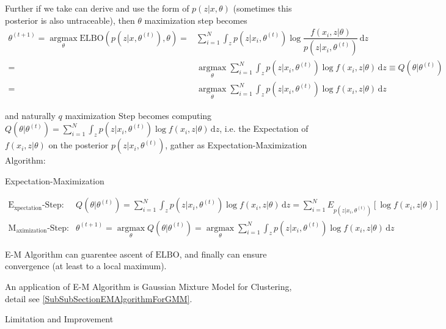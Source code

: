     Further if we take can derive and use the form of $ p(z|x,\theta ) $ (sometimes this posterior is also untraceable), then $ \theta  $ maximization step becomes 
\begin{align}
    \theta ^{(t+1)}=\mathop{\arg\max}\limits_{\theta } \mathrm{ELBO} \left(p(z|x,\theta^{(t)} ),\theta \right)=&\sum_{i=1}^N\int_z p(z|x_i,\theta^{(t)})\log\dfrac{f(x_i,z|\theta )}{p(z|x_i,\theta^{(t)})} \,\mathrm{d}z\\
    =&\mathop{\arg\max }\limits_{\theta } \sum_{i=1}^N\int_z p(z|x_i,\theta^{(t)})\log f(x_i,z|\theta ) \,\mathrm{d}z\equiv Q(\theta |\theta ^{(t)})\\
    =&\mathop{\arg\max }\limits_{\theta }\sum_{i=1}^N \int_z p(z|x_i,\theta^{(t)})\log f(x_i,z|\theta ) \,\mathrm{d}z
\end{align}
    
    and naturally $ q $ maximization Step becomes computing $ \displaystyle Q(\theta |\theta ^{(t)})=\sum_{i=1}^N \int_z p(z|x_i,\theta^{(t)})\log f(x_i,z|\theta ) \,\mathrm{d}z $, i.e. the Expectation of $ f(x_i,z|\theta ) $ on the posterior $ p(z|x_i,\theta ^{(t)}) $, gather as Expectation-Maximization Algorithm:
\begin{algorithm}{Expectation-Maximization}

\begin{align}
    \mathrm{E_{xpectation}}\text{-Step}:&\,Q(\theta |\theta ^{(t)})=\sum_{i=1}^N \int_z p(z|x_i,\theta^{(t)})\log f(x_i,z|\theta ) \,\mathrm{d}z=\sum_{i=1}^NE_{p(z|x_i,\theta ^{(t)})}\left[\log f(x_i,z|\theta )\right]\\
    \mathrm{M_{aximization}}\text{-Step}:&\, \theta ^{(t+1)}=\mathop{\arg\max}\limits_{\theta }Q(\theta |\theta ^{(t)})=  \mathop{\arg\max}\limits_{\theta }\sum_{i=1}^N \int_z p(z|x_i,\theta^{(t)})\log f(x_i,z|\theta ) \,\mathrm{d}z
\end{align}
    
\end{algorithm}
    

    E-M Algorithm can guarentee ascent of $ \mathrm{ELBO}  $, and finally can ensure convergence (at least to a local maximum).

    An application of E-M Algorithm is Gaussian Mixture Model for Clustering, detail see \autoref{SubSubSectionEMAlgorithmForGMM}.

\begin{point}
    Limitation and Improvement
\end{point}

